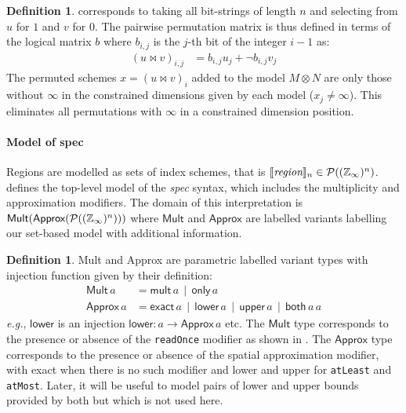 \documentclass[10pt,preprint]{sigplanconf}
\newcounter{block}
\theoremstyle{definition}
\newtheorem{definition}[block]{Definition}
\newcommand{\eg}{\emph{e.g.}}
\newcommand{\interp}[1]{\llbracket{#1}\rrbracket}
\newcommand{\term}[1]{\texttt{#1}}
\begin{document}
\begin{definition}
corresponds to taking all bit-strings of length $n$ and
selecting from $u$ for $1$ and $v$ for $0$. The pairwise permutation
matrix is thus defined in terms of the logical
matrix $b$ where $b_{i,j}$ is the $j$-th bit of the integer
$i - 1$ as:
%
\begin{align*}
(u \bowtie v)_{i,j} & = b_{i,j} u_j + \neg b_{i,j} v_j
\end{align*}
%
The permuted schemes $x = (u \bowtie v)_i$ added to the model
$M \otimes N$ are only those without $\infty$ in
the constrained dimensions given by each model ($x_j \neq
\infty$). This eliminates all permutations with
$\infty$ in a constrained dimension position.
\end{definition}

\paragraph{Model of spec}

Regions are modelled as sets of index
schemes, that is
$\interp{\textit{region}}_n \in \mathcal{P}((\domainVal{})^n)$.
 defines the top-level model of the
\textit{spec} syntax, which includes the multiplicity and
approximation modifiers. The domain of this interpretation
is $\textsf{Mult}(\textsf{Approx}(\mathcal{P}((\mathbb{Z}_\infty{})^n)))$
where $\textsf{Mult}$ and $\textsf{Approx}$ are labelled variants
labelling our set-based model with additional information.

\begin{definition} \textsf{Mult}
and \textsf{Approx} are parametric labelled variant types
with injection function given by their definition:
%
\begin{align*}
\textsf{Mult} \, a & = \textsf{mult} \, a \,\mid\, \textsf{only} \, a \\
\textsf{Approx} \, a & = \textsf{exact} \, a \,\mid\, \textsf{lower} \, a \,\mid\,
\textsf{upper} \, a \,\mid\, \textsf{both} \, a \, a
\end{align*}
\eg{}, $\mathsf{lower}$ is an injection
$\mathsf{lower} : a \rightarrow \mathsf{Approx} \, a$ etc. The
$\textsf{Mult}$ type corresponds to the presence or absence of the
\term{readOnce} modifier as shown in .
The $\textsf{Approx}$ type corresponds to the presence or absence of
the spatial approximation modifier, with \textsf{exact} when there is
no such modifier and \textsf{lower} and \textsf{upper} for
\term{atLeast} and \term{atMost}. Later, it will be useful to model
pairs of lower and upper bounds provided by \textsf{both} but which is
not used
here.%
\label{def:mult-and-approx}
\end{definition}
\end{document}
